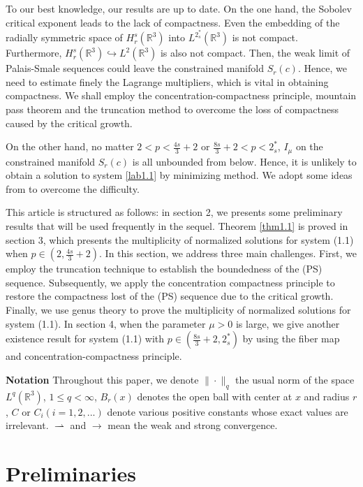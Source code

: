 \begin{remark}\rm
To our best knowledge, our results are up to date. On the one hand,
the Sobolev critical exponent leads to the lack of compactness.
Even the embedding of the radially symmetric space of $H^s_r(\mathbb{R}^3)$ into
$L^{2^*_s}(\mathbb{R}^3)$ is not compact. Furthermore,
$H^s_r(\mathbb{R}^3)\hookrightarrow L^2(\mathbb{R}^3)$ is also not compact.
Then, the weak limit of Palais-Smale sequences could leave the constrained manifold
$S_r(c)$. Hence, we need to estimate finely the Lagrange multipliers, which is vital
in obtaining compactness. We shall employ the concentration-compactness principle,
mountain pass theorem and the truncation method to overcome the loss of compactness
caused by the critical growth.

On the other hand, no matter $2<p<{\frac{4s}{3}+2}$ or $\frac{8s}{3}+2<p<2^*_s$,
$I_\mu$ on the constrained manifold $S_r(c)$ is all unbounded from below.
Hence, it is unlikely to obtain a solution to system \eqref{lab1.1} by minimizing
method. We adopt some ideas from \cite{A5878} to overcome the difficulty.
\end{remark}

This article is structured as follows:
in section 2, we presents some preliminary results that will be  used frequently
 in the sequel.
Theorem \ref{thm1.1} is proved in section 3, which presents the multiplicity of
normalized solutions for system (1.1) when $p\in(2, \frac{4s}{3}+2)$.
In this section, we address three main challenges. First, we employ the truncation
technique to establish the boundedness of the (PS) sequence. Subsequently, we apply
the concentration compactness principle to restore the compactness lost of
the (PS) sequence due to the critical growth. Finally, we use genus theory to prove
the multiplicity of normalized solutions for system (1.1).
In section 4, when the parameter $\mu>0$ is large, we give another existence result
for system (1.1) with $p\in( \frac{8s}{3}+2, 2^*_s)$ by using the fiber map and
concentration-compactness principle.

\noindent\textbf{Notation}
Throughout this paper, we denote $\|\cdot\|_q$ the usual norm of the  space
$L^q(\mathbb{R}^3)$, $1\leq q <\infty$, $B_r(x)$ denotes the open ball with center at
$x$ and radius $r$, $C$ or $C_i (i=1,2,...)$ denote various positive constants whose
exact values are irrelevant. $\rightharpoonup$ and $\to$ mean the weak and strong
convergence.

\section{Preliminaries}

